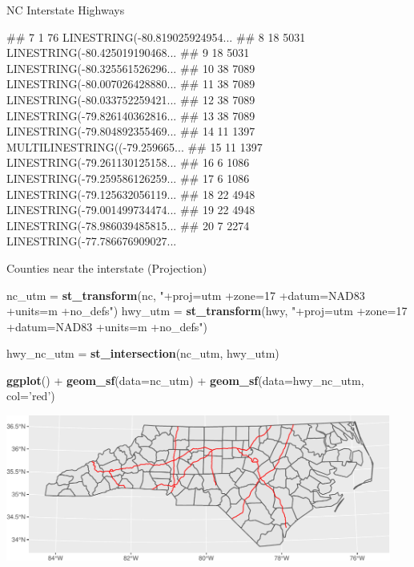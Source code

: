 \documentclass[11pt,ignorenonframetext,]{beamer}
\newenvironment{Shaded}{}{}
\newcommand{\KeywordTok}[1]{\textcolor[rgb]{0.00,0.44,0.13}{\textbf{#1}}}
\newcommand{\DataTypeTok}[1]{\textcolor[rgb]{0.56,0.13,0.00}{#1}}
\newcommand{\StringTok}[1]{\textcolor[rgb]{0.25,0.44,0.63}{#1}}
\newcommand{\OperatorTok}[1]{\textcolor[rgb]{0.40,0.40,0.40}{#1}}
\newcommand{\NormalTok}[1]{#1}
\let\oldShaded\Shaded
\let\endoldShaded\endShaded
\renewenvironment{Shaded}{\footnotesize\begin{spacing}{0.9}\oldShaded}{\endoldShaded\end{spacing}}
\let\oldverbatim\verbatim
\let\endoldverbatim\endverbatim
\newcommand{\scriptoutput}{
  \renewenvironment{Shaded}{\scriptsize\begin{spacing}{0.9}\oldShaded}{\endoldShaded\end{spacing}}
  \renewenvironment{verbatim}{\scriptsize\begin{spacing}{0.9}\oldverbatim}{\endoldverbatim\end{spacing}}
}
\begin{document}
\begin{frame}[fragile,t]{NC Interstate Highways}
\begin{Shaded}
\begin{Highlighting}[]
\NormalTok{## 7      1      76 LINESTRING(-80.819025924954...}
\NormalTok{## 8     18    5031 LINESTRING(-80.425019190468...}
\NormalTok{## 9     18    5031 LINESTRING(-80.325561526296...}
\NormalTok{## 10    38    7089 LINESTRING(-80.007026428880...}
\NormalTok{## 11    38    7089 LINESTRING(-80.033752259421...}
\NormalTok{## 12    38    7089 LINESTRING(-79.826140362816...}
\NormalTok{## 13    38    7089 LINESTRING(-79.804892355469...}
\NormalTok{## 14    11    1397 MULTILINESTRING((-79.259665...}
\NormalTok{## 15    11    1397 LINESTRING(-79.261130125158...}
\NormalTok{## 16     6    1086 LINESTRING(-79.259586126259...}
\NormalTok{## 17     6    1086 LINESTRING(-79.125632056119...}
\NormalTok{## 18    22    4948 LINESTRING(-79.001499734474...}
\NormalTok{## 19    22    4948 LINESTRING(-78.986039485815...}
\NormalTok{## 20     7    2274 LINESTRING(-77.786676909027...}
\end{Highlighting}
\end{Shaded}

\end{frame}

\begin{frame}[fragile,t]{Counties near the interstate (Projection)}

\scriptoutput

\begin{Shaded}
\begin{Highlighting}[]
\NormalTok{nc_utm  =}\StringTok{ }\KeywordTok{st_transform}\NormalTok{(nc,  }\StringTok{"+proj=utm +zone=17 +datum=NAD83 +units=m +no_defs"}\NormalTok{)}
\NormalTok{hwy_utm =}\StringTok{ }\KeywordTok{st_transform}\NormalTok{(hwy, }\StringTok{"+proj=utm +zone=17 +datum=NAD83 +units=m +no_defs"}\NormalTok{)}

\NormalTok{hwy_nc_utm =}\StringTok{ }\KeywordTok{st_intersection}\NormalTok{(nc_utm, hwy_utm)}

\KeywordTok{ggplot}\NormalTok{() }\OperatorTok{+}\StringTok{ }
\StringTok{  }\KeywordTok{geom_sf}\NormalTok{(}\DataTypeTok{data=}\NormalTok{nc_utm) }\OperatorTok{+}
\StringTok{  }\KeywordTok{geom_sf}\NormalTok{(}\DataTypeTok{data=}\NormalTok{hwy_nc_utm, }\DataTypeTok{col=}\StringTok{'red'}\NormalTok{)}
\end{Highlighting}
\end{Shaded}

\begin{center}\includegraphics[width=0.95\textwidth]{Lec17_files/figure-beamer/unnamed-chunk-28-1} \end{center}

\end{frame}
\end{document}
